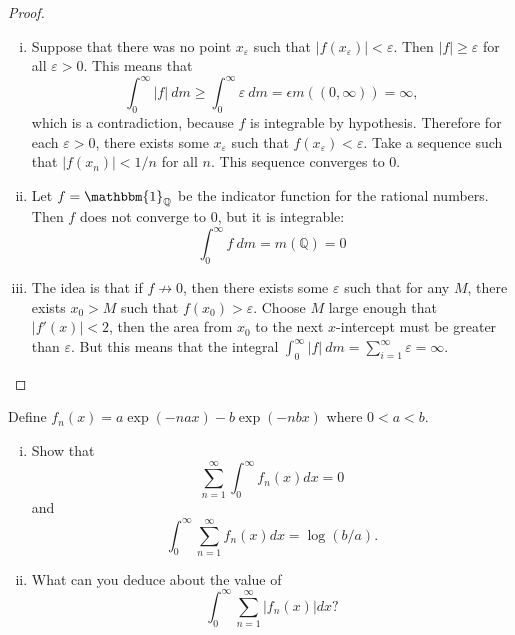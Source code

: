 \documentclass{article}
\newenvironment{problem}[2][Problem]{\begin{trivlist}
\item[\hskip \labelsep {\bfseries #1}\hskip \labelsep {\bfseries #2.}]}{\end{trivlist}}
\begin{document}
\begin{proof}
	\begin{enumerate}[(i)]
    	\item Suppose that there was no point $x_\varepsilon$ such that $|f(x_\varepsilon)| < \varepsilon$. Then $|f| \geq \varepsilon$ for all $\varepsilon > 0$. This means that \[
        	\int_{0}^{\infty} |f|\ dm \geq \int_{0}^{\infty} \varepsilon\ dm = \epsilon m((0, \infty)) = \infty,
        \] which is a contradiction, because $f$ is integrable by hypothesis.
        Therefore for each $\varepsilon > 0$, there exists some $x_\varepsilon$ such that $f(x_\varepsilon) < \varepsilon$. Take a sequence such that $|f(x_n)| < 1/n$ for all $n$. This sequence converges to 0.
        \item Let $f = \mathbbm{1}_{\mathbb{Q}}$ be the indicator function for the rational numbers. Then $f$ does not converge to $0$, but it is integrable: \[
        	\int_0^\infty f\ dm = 
            m(\mathbb{Q}) =
            0
        \]
        \item The idea is that if $f \not\rightarrow 0$, then there exists some $\varepsilon$ such that for any $M$, there exists $x_0 > M$ such that $f(x_0) > \varepsilon$. Choose $M$ large enough that $|f'(x)| < 2$, then the area from $x_0$ to the next $x$-intercept must be greater than $\varepsilon$. But this means that the integral $\int_0^\infty |f|\ dm = \sum_{i = 1}^{\infty} \varepsilon = \infty$.	
    \end{enumerate}
\end{proof}

\pagebreak

\begin{problem}{3} Define $f_n(x) = a\exp(-nax)-b\exp(-nbx)$ where $0 < a < b$.
	\begin{enumerate}[(i)]
    	\item Show that \[
        	\sum_{n = 1}^{\infty} \int_{0}^{\infty} f_n(x) dx = 0
        \] and \[
        	\int_{0}^{\infty} \sum_{n = 1}^{\infty} f_n(x) dx = \log(b/a).
        \]
        \item What can you deduce about the value of \[
	        \int_{0}^{\infty} \sum_{n = 1}^{\infty} \left|f_n(x)\right| dx?
        \]
    \end{enumerate}
\end{problem}
\end{document}
